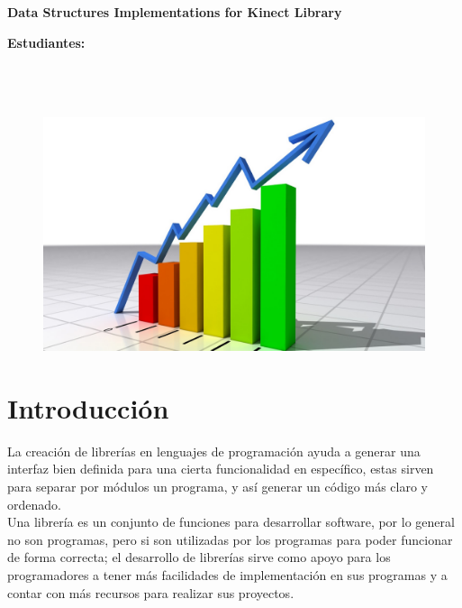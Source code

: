 \documentclass[letterpaper]{article}
\begin{document}
\vspace*{2cm}

\begin{center}
\Huge
\textbf{Data Structures Implementations for Kinect Library}
\vspace*{1cm}
\end{center}

\noindent
\small\baselineskip=14pt
\textbf{Estudiantes:} \\
\\
\\
\\


\begin{figure}[ht]
\includegraphics[width=1\linewidth]{ese.jpg}
\end{figure}


\section{Introducción}
La creación de librerías en lenguajes de programación ayuda a generar una interfaz bien definida para una cierta funcionalidad en específico, 
estas sirven para separar por módulos un programa, y así generar un código más claro y ordenado.\\

Una librería es un conjunto de funciones para desarrollar software, por lo general no son programas, pero si son utilizadas por los programas 
para poder funcionar de forma correcta; el desarrollo de librerías sirve como apoyo para los programadores a tener más facilidades de implementación 
en sus programas y a contar con más recursos para realizar sus proyectos.\\
\end{document}
